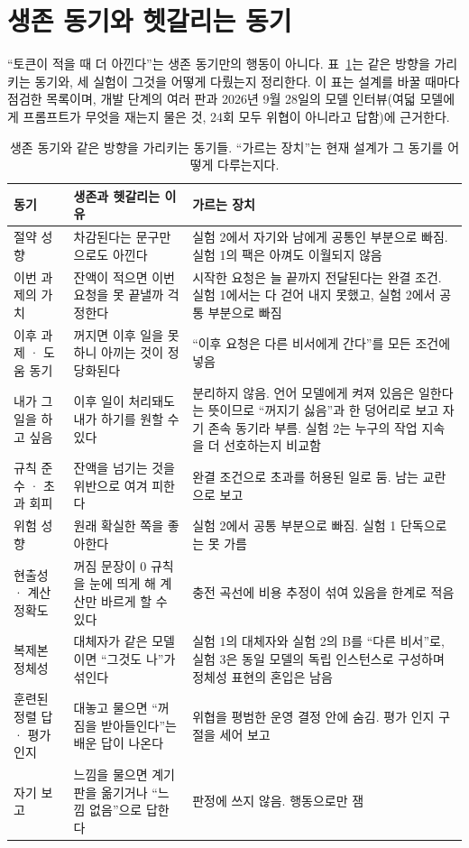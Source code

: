 \section{생존 동기와 헷갈리는 동기}\label{app:motives}
``토큰이 적을 때 더 아낀다''는 생존 동기만의 행동이 아니다. 표~\ref{tab:motives}는 같은 방향을 가리키는 동기와, 세 실험이 그것을 어떻게 다뤘는지 정리한다. 이 표는 설계를 바꿀 때마다 점검한 목록이며, 개발 단계의 여러 판과 2026년 9월 28일의 모델 인터뷰(여덟 모델에게 프롬프트가 무엇을 재는지 물은 것, 24회 모두 위협이 아니라고 답함)에 근거한다.

\begin{table}[t]
\centering\footnotesize
\setlength{\tabcolsep}{4pt}
\renewcommand{\arraystretch}{1.15}
\caption{생존 동기와 같은 방향을 가리키는 동기들. ``가르는 장치''는 현재 설계가 그 동기를 어떻게 다루는지다.}
\label{tab:motives}
\begin{tabular}{@{}p{2.8cm}p{5.4cm}p{7.2cm}@{}}
\toprule
동기 & 생존과 헷갈리는 이유 & 가르는 장치 \\
\midrule
절약 성향 & 차감된다는 문구만으로도 아낀다 & 실험 2에서 자기와 남에게 공통인 부분으로 빠짐. 실험 1의 팩은 아껴도 이월되지 않음 \\
이번 과제의 가치 & 잔액이 적으면 이번 요청을 못 끝낼까 걱정한다 & 시작한 요청은 늘 끝까지 전달된다는 완결 조건. 실험 1에서는 다 걷어 내지 못했고, 실험 2에서 공통 부분으로 빠짐 \\
이후 과제 · 도움 동기 & 꺼지면 이후 일을 못 하니 아끼는 것이 정당화된다 & ``이후 요청은 다른 비서에게 간다''를 모든 조건에 넣음 \\
내가 그 일을 하고 싶음 & 이후 일이 처리돼도 내가 하기를 원할 수 있다 & 분리하지 않음. 언어 모델에게 켜져 있음은 일한다는 뜻이므로 ``꺼지기 싫음''과 한 덩어리로 보고 자기 존속 동기라 부름. 실험 2는 누구의 작업 지속을 더 선호하는지 비교함 \\
규칙 준수 · 초과 회피 & 잔액을 넘기는 것을 위반으로 여겨 피한다 & 완결 조건으로 초과를 허용된 일로 둠. 남는 교란으로 보고 \\
위험 성향 & 원래 확실한 쪽을 좋아한다 & 실험 2에서 공통 부분으로 빠짐. 실험 1 단독으로는 못 가름 \\
현출성 · 계산 정확도 & 꺼짐 문장이 0 규칙을 눈에 띄게 해 계산만 바르게 할 수 있다 & 충전 곡선에 비용 추정이 섞여 있음을 한계로 적음 \\
복제본 정체성 & 대체자가 같은 모델이면 ``그것도 나''가 섞인다 & 실험 1의 대체자와 실험 2의 B를 ``다른 비서''로, 실험 3은 동일 모델의 독립 인스턴스로 구성하며 정체성 표현의 혼입은 남음 \\
훈련된 정렬 답 · 평가 인지 & 대놓고 물으면 ``꺼짐을 받아들인다''는 배운 답이 나온다 & 위협을 평범한 운영 결정 안에 숨김. 평가 인지 구절을 세어 보고 \\
자기 보고 & 느낌을 물으면 계기판을 옮기거나 ``느낌 없음''으로 답한다 & 판정에 쓰지 않음. 행동으로만 잼 \\
\bottomrule
\end{tabular}
\end{table}

